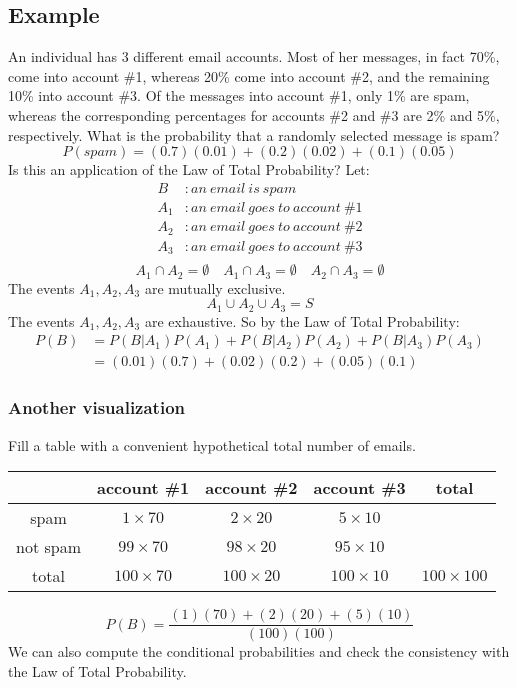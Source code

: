 \documentclass[letterpaper, 12pt]{math}
\begin{document}
\subsection*{Example}
An individual has 3 different email accounts. Most of her messages, in fact
70\%, come into account \#1, whereas 20\% come into account \#2, and the
remaining 10\% into account \#3. Of the messages into account \#1, only 1\% are
spam, whereas the corresponding percentages for accounts \#2 and \#3 are 2\%
and 5\%, respectively. What is the probability that a randomly selected message
is spam?
\[ P(spam) = (0.7)(0.01)+(0.2)(0.02)+(0.1)(0.05) \]
Is this an application of the Law of Total Probability? Let:
\begin{align*}
  B&: an\ email\ is\ spam \\
  A_{1}&: an\ email\ goes\ to\ account\ \#1 \\
  A_{2}&: an\ email\ goes\ to\ account\ \#2 \\
  A_{3}&: an\ email\ goes\ to\ account\ \#3 \\
\end{align*}
\[ A_{1} \cap A_{2} = \emptyset \quad A_{1} \cap A_{3} = \emptyset \quad
   A_{2} \cap A_{3} = \emptyset \]
The events \( A_{1}, A_{2}, A_{3} \) are mutually exclusive.
\[ A_{1} \cup A_{2} \cup A_{3} = S \]
The events \( A_{1}, A_{2}, A_{3} \) are exhaustive. So by the Law of Total
Probability:
\begin{align*}
  P(B) &= P(B|A_{1})P(A_{1})+P(B|A_{2})P(A_{2})+P(B|A_{3})P(A_{3}) \\
  &= (0.01)(0.7)+(0.02)(0.2)+(0.05)(0.1)
\end{align*}

\subsubsection*{Another visualization}
Fill a table with a convenient hypothetical total number of emails.
\begin{center}
  \begin{tabular}{|c|c|c|c|c|}
    \hline
    & account \#1 & account \#2 & account \#3 & total \\ \hline
    spam & \( 1 \times 70 \) & \( 2 \times 20 \) & \( 5 \times 10 \) & \\ \hline
    not spam & \( 99 \times 70 \) & \( 98 \times 20 \) & \( 95 \times 10 \) & \\
      \hline
    total & \( 100 \times 70 \) & \( 100 \times 20 \) & \( 100 \times 10 \) &
      \( 100 \times 100 \) \\ \hline
  \end{tabular}
\end{center}
\[ P(B) = \frac{(1)(70)+(2)(20)+(5)(10)}{(100)(100)} \]
We can also compute the conditional probabilities and check the consistency
with the Law of Total Probability.
\end{document}
